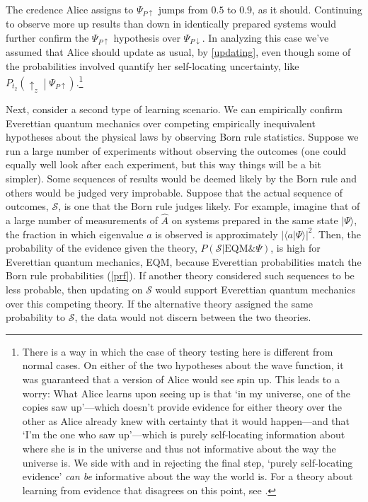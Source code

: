 \documentclass[12pt,onecolumn,secnumarabic,amsmath,amssymb,balancelastpage,nofootinbib]{article}
\begin{document}
The credence Alice assigns to $\Psi_{P\uparrow}$ jumps from $0.5$ to $0.9$, as it should.  Continuing to observe more up results than down in identically prepared systems would further confirm the $\Psi_{P\uparrow}$ hypothesis over $\Psi_{P\downarrow}$.   In analyzing this case we've assumed that Alice should update as usual, by \eqref{updating}, even though some of the probabilities involved quantify her self-locating uncertainty, like $P_{t_2}\left(\uparrow_z\middle|\Psi_{P\uparrow}\right)$.\footnote{There is a way in which the case of theory testing here is different from normal cases.  On either of the two hypotheses about the wave function, it was guaranteed that a version of Alice would see spin up.  This leads to a worry:  What Alice learns upon seeing up is that `in my universe, one of the copies saw up'---which doesn't provide evidence for either theory over the other as Alice already knew with certainty that it would happen---and that `I'm the one who saw up'---which is purely self-locating information about where she is in the universe and thus not informative about the way the universe is.  We {side} with \citet{titelbaum2008} and \citet[pp. 294-295]{greavesM} {in rejecting the final step,} `purely self-locating evidence' {\emph{can be} informative about the way the world is}.  For a theory about learning from evidence that disagrees on this point, see \citet{meacham2008}.}

Next, consider a second type of learning scenario.  We can empirically confirm Everettian quantum mechanics over competing empirically inequivalent hypotheses about the physical laws by observing Born rule statistics.  Suppose we run a large number of experiments without observing the outcomes (one could equally well look after each experiment, but this way things will be a bit simpler).  Some sequences of results would be deemed likely by the Born rule and others would be judged very improbable.  Suppose that the actual sequence of outcomes, $\mathscr{S}$, is one that the Born rule judges likely. {For example, imagine} that of a large number of measurements of $\widehat{A}$ on systems prepared in the same state $|\Psi\rangle$, the fraction in which eigenvalue $a$ is observed  is approximately $|\langle a|\Psi\rangle|^2$.  Then, the probability of the evidence given the theory, $P(\mathscr{S}|\text{EQM}\&\Psi)$, is high for Everettian quantum mechanics, EQM, because Everettian probabilities match the Born rule probabilities (\textsection \ref{prf}).  If another theory considered such sequences to be less probable, then updating on $\mathscr{S}$ would support Everettian quantum mechanics over this competing theory.  If the alternative theory assigned the same probability to $\mathscr{S}$, the data would not discern between the two theories.
\end{document}
